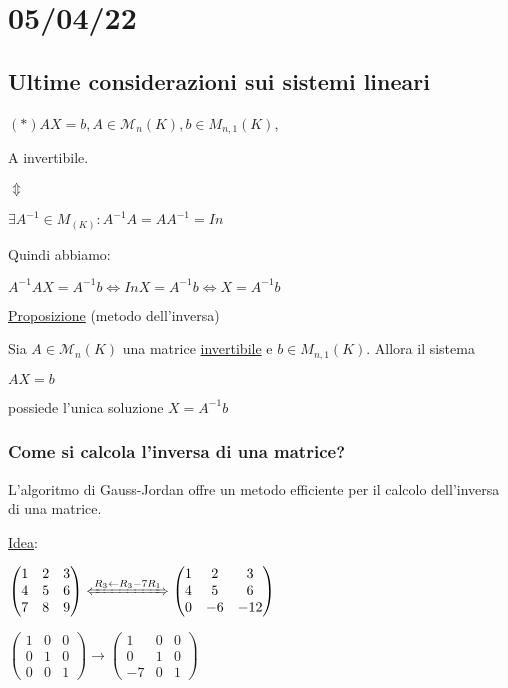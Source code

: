 \documentclass{article}
\newcommand{\ul}[1]{\underline{#1}}
\newcommand{\M}{\mathcal{M}}
\begin{document}
\section{05/04/22}
\subsection{Ultime considerazioni sui sistemi lineari}
$(*)AX=b,A\in \M_n(K),b\in M_{n,1}(K)$,

A invertibile.

$\Updownarrow$

$\exists A^{-1}\in M_(K): A^{-1}A=AA^{-1}=In$

Quindi abbiamo:

$A^{-1}AX=A^{-1}b\Leftrightarrow InX=A^{-1}b\Leftrightarrow X=A^{-1}b$

\ul{Proposizione} (metodo dell'inversa)

Sia $A\in \M_n(K)$ una matrice \ul{invertibile} e $b\in M_{n,1}(K)$. Allora il sistema

$AX=b$

possiede l'unica soluzione $X=A^{-1}b$

\subsubsection*{Come si calcola l'inversa di una matrice?}

L'algoritmo di Gauss-Jordan offre un metodo efficiente per il calcolo dell'inversa di una matrice.

\ul{Idea}:

$\begin{pmatrix}
		1 & 2 & 3 \\
		4 & 5 & 6 \\
		7 & 8 & 9 \\
	\end{pmatrix}\xLeftrightarrow{R_3\leftarrow R_3-7R_1}
	\begin{pmatrix}
		1 & 2  & 3   \\
		4 & 5  & 6   \\
		0 & -6 & -12 \\
	\end{pmatrix}$

$\begin{pmatrix}
		1 & 0 & 0 \\
		0 & 1 & 0 \\
		0 & 0 & 1
	\end{pmatrix}\rightarrow
	\begin{pmatrix}
		1  & 0 & 0 \\
		0  & 1 & 0 \\
		-7 & 0 & 1
	\end{pmatrix}$
\end{document}
